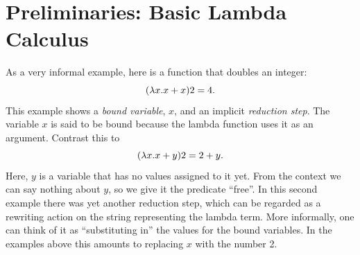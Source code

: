 
\chapter{Preliminaries: Basic Lambda Calculus}
\label{chap:theory}

As a very informal example, here is a function that doubles an integer:
\begin{equation*}
	(\lambda x.x+x)2=4.
\end{equation*}
This example shows a \emph{bound variable}, $x$, and an implicit \emph{reduction step}. The variable $x$
is said to be bound because the lambda function uses it as an argument. Contrast this to
\begin{equation*}
	(\lambda x.x+y)2=2+y.
\end{equation*}
Here, $y$ is a variable that has no values assigned to it yet. From
the context we can say nothing about $y$, so we give it the predicate
``free''. In this second example there was yet another reduction step, which 
can be regarded as a rewriting action on the string representing the
lambda term. More informally, one can think of it as ``substituting in''
the values for the bound variables. In the examples above this amounts to
replacing $x$ with the number 2.

